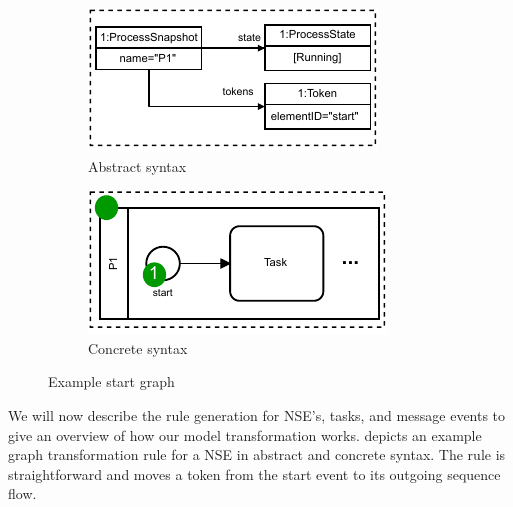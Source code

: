 \documentclass[submission, copyright, creativecommons]{eptcs}
\begin{document}
\begin{figure}
\centering
\begin{subfigure}{.35\textwidth}
  \centering
  \includegraphics[width=1\linewidth]{images/startGraph_abstract.pdf}
  \caption{Abstract syntax}
  \label{fig:startGraphAbstract}
\end{subfigure}%
\begin{subfigure}{.35\textwidth}
  \centering
  \includegraphics[width=1\linewidth]{images/startGraph_concrete.pdf}
  \caption{Concrete syntax}
  \label{fig:startGraphConcrete}
\end{subfigure}
\caption{Example start graph}
\label{fig:startGraph}
\end{figure}

We will now describe the rule generation for NSE's, tasks, and message events to give an overview of how our model transformation works.
 depicts an example graph transformation rule for a NSE in abstract and concrete syntax.
The rule is straightforward and moves a token from the start event to its outgoing sequence flow.
\end{document}
